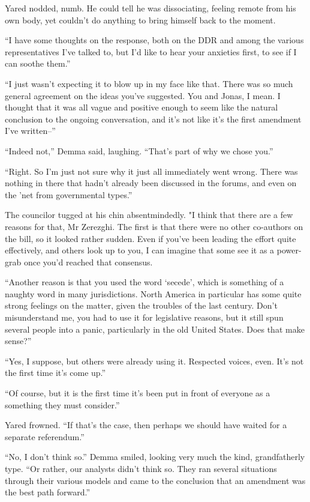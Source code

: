 Yared nodded, numb. He could tell he was dissociating, feeling remote from his own body, yet couldn't do anything to bring himself back to the moment.

``I have some thoughts on the response, both on the DDR and among the various representatives I've talked to, but I'd like to hear your anxieties first, to see if I can soothe them.''

``I just wasn't expecting it to blow up in my face like that. There was so much general agreement on the ideas you've suggested. You and Jonas, I mean. I thought that it was all vague and positive enough to seem like the natural conclusion to the ongoing conversation, and it's not like it's the first amendment I've written--''

``Indeed not,'' Demma said, laughing. ``That's part of why we chose you.''

``Right. So I'm just not sure why it just all immediately went wrong. There was nothing in there that hadn't already been discussed in the forums, and even on the 'net from governmental types.''

The councilor tugged at his chin absentmindedly. "I think that there are a few reasons for that, Mr Zerezghi. The first is that there were no other co-authors on the bill, so it looked rather sudden. Even if you've been leading the effort quite effectively, and others look up to you, I can imagine that some see it as a power-grab once you'd reached that consensus.

``Another reason is that you used the word `secede', which is something of a naughty word in many jurisdictions. North America in particular has some quite strong feelings on the matter, given the troubles of the last century. Don't misunderstand me, you had to use it for legislative reasons, but it still spun several people into a panic, particularly in the old United States. Does that make sense?''

``Yes, I suppose, but others were already using it. Respected voices, even. It's not the first time it's come up.''

``Of course, but it is the first time it's been put in front of everyone as a something they must consider.''

Yared frowned. ``If that's the case, then perhaps we should have waited for a separate referendum.''

``No, I don't think so.'' Demma smiled, looking very much the kind, grandfatherly type. ``Or rather, our analysts didn't think so. They ran several situations through their various models and came to the conclusion that an amendment was the best path forward.''

